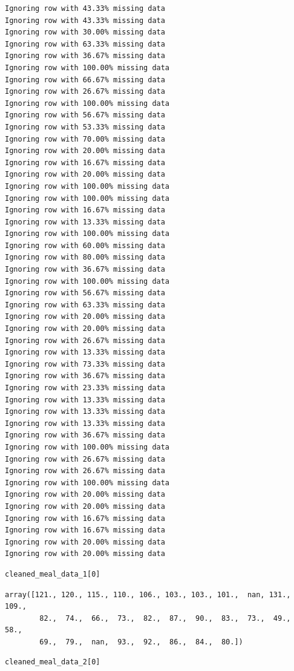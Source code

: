 \begin{verbatim}
Ignoring row with 43.33% missing data
Ignoring row with 43.33% missing data
Ignoring row with 30.00% missing data
Ignoring row with 63.33% missing data
Ignoring row with 36.67% missing data
Ignoring row with 100.00% missing data
Ignoring row with 66.67% missing data
Ignoring row with 26.67% missing data
Ignoring row with 100.00% missing data
Ignoring row with 56.67% missing data
Ignoring row with 53.33% missing data
Ignoring row with 70.00% missing data
Ignoring row with 20.00% missing data
Ignoring row with 16.67% missing data
Ignoring row with 20.00% missing data
Ignoring row with 100.00% missing data
Ignoring row with 100.00% missing data
Ignoring row with 16.67% missing data
Ignoring row with 13.33% missing data
Ignoring row with 100.00% missing data
Ignoring row with 60.00% missing data
Ignoring row with 80.00% missing data
Ignoring row with 36.67% missing data
Ignoring row with 100.00% missing data
Ignoring row with 56.67% missing data
Ignoring row with 63.33% missing data
Ignoring row with 20.00% missing data
Ignoring row with 20.00% missing data
Ignoring row with 26.67% missing data
Ignoring row with 13.33% missing data
Ignoring row with 73.33% missing data
Ignoring row with 36.67% missing data
Ignoring row with 23.33% missing data
Ignoring row with 13.33% missing data
Ignoring row with 13.33% missing data
Ignoring row with 13.33% missing data
Ignoring row with 36.67% missing data
Ignoring row with 100.00% missing data
Ignoring row with 26.67% missing data
Ignoring row with 26.67% missing data
Ignoring row with 100.00% missing data
Ignoring row with 20.00% missing data
Ignoring row with 20.00% missing data
Ignoring row with 16.67% missing data
Ignoring row with 16.67% missing data
Ignoring row with 20.00% missing data
Ignoring row with 20.00% missing data
\end{verbatim}

\begin{verbatim}
cleaned_meal_data_1[0]
\end{verbatim}

\begin{verbatim}
array([121., 120., 115., 110., 106., 103., 103., 101.,  nan, 131., 109.,
        82.,  74.,  66.,  73.,  82.,  87.,  90.,  83.,  73.,  49.,  58.,
        69.,  79.,  nan,  93.,  92.,  86.,  84.,  80.])
\end{verbatim}

\begin{verbatim}
cleaned_meal_data_2[0]
\end{verbatim}

